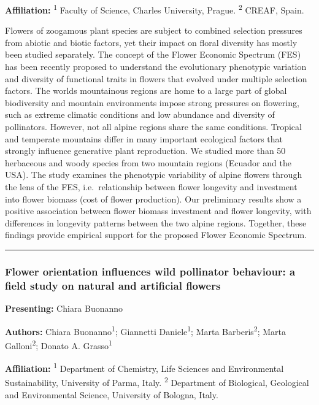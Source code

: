 \documentclass[
  letterpaper,
  DIV=11,
  numbers=noendperiod]{scrartcl}
\begin{document}
\textbf{Affiliation:} \textsuperscript{1} Faculty of Science, Charles
University, Prague. \textsuperscript{2} CREAF, Spain.

Flowers of zoogamous plant species are subject to combined selection
pressures from abiotic and biotic factors, yet their impact on floral
diversity has mostly been studied separately. The concept of the Flower
Economic Spectrum (FES) has been recently proposed to understand the
evolutionary phenotypic variation and diversity of functional traits in
flowers that evolved under multiple selection factors. The
world\textquotesingle s mountainous regions are home to a large part of
global biodiversity and mountain environments impose strong pressures on
flowering, such as extreme climatic conditions and low abundance and
diversity of pollinators. However, not all alpine regions share the same
conditions. Tropical and temperate mountains differ in many important
ecological factors that strongly influence generative plant
reproduction. We studied more than 50 herbaceous and woody species from
two mountain regions (Ecuador and the USA). The study examines the
phenotypic variability of alpine flowers through the lens of the FES,
i.e.~relationship between flower longevity and investment into flower
biomass (cost of flower production). Our preliminary results show a
positive association between flower biomass investment and flower
longevity, with differences in longevity patterns between the two alpine
regions. Together, these findings provide empirical support for the
proposed Flower Economic Spectrum.

\begin{center}\rule{0.5\linewidth}{0.5pt}\end{center}

\subsubsection{Flower orientation influences wild pollinator behaviour:
a field study on natural and artificial
flowers}\label{flower-orientation-influences-wild-pollinator-behaviour-a-field-study-on-natural-and-artificial-flowers}

\textbf{Presenting:} Chiara Buonanno

\textbf{Authors:} Chiara Buonanno\textsuperscript{1}; Giannetti
Daniele\textsuperscript{1}; Marta Barberis\textsuperscript{2}; Marta
Galloni\textsuperscript{2}; Donato A. Grasso\textsuperscript{1}

\textbf{Affiliation:} \textsuperscript{1} Department of Chemistry, Life
Sciences and Environmental Sustainability, University of Parma, Italy.
\textsuperscript{2} Department of Biological, Geological and
Environmental Science, University of Bologna, Italy.
\end{document}
